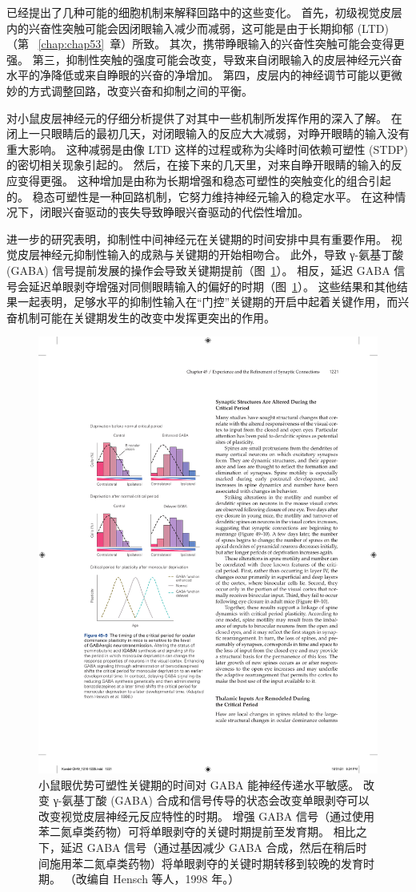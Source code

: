 已经提出了几种可能的细胞机制来解释回路中的这些变化。
首先，初级视觉皮层内的兴奋性突触可能会因闭眼输入减少而减弱，这可能是由于长期抑郁 (LTD)（第 ~\ref{chap:chap53}~章）所致。
其次，携带睁眼输入的兴奋性突触可能会变得更强。
第三，抑制性突触的强度可能会改变，导致来自闭眼输入的皮层神经元兴奋水平的净降低或来自睁眼的兴奋的净增加。
第四，皮层内的神经调节可能以更微妙的方式调整回路，改变兴奋和抑制之间的平衡。


对小鼠皮层神经元的仔细分析提供了对其中一些机制所发挥作用的深入了解。
在闭上一只眼睛后的最初几天，对闭眼输入的反应大大减弱，对睁开眼睛的输入没有重大影响。
这种减弱是由像 LTD 这样的过程或称为尖峰时间依赖可塑性 (STDP) 的密切相关现象引起的。
然后，在接下来的几天里，对来自睁开眼睛的输入的反应变得更强。
这种增加是由称为长期增强和稳态可塑性的突触变化的组合引起的。
稳态可塑性是一种回路机制，它努力维持神经元输入的稳定水平。
在这种情况下，闭眼兴奋驱动的丧失导致睁眼兴奋驱动的代偿性增加。


进一步的研究表明，抑制性中间神经元在关键期的时间安排中具有重要作用。
视觉皮层神经元抑制性输入的成熟与关键期的开始相吻合。
此外，导致 γ-氨基丁酸 (GABA) 信号提前发展的操作会导致关键期提前（图~\ref{fig:49_9}）。
相反，延迟 GABA 信号会延迟单眼剥夺增强对同侧眼睛输入的偏好的时期（图~\ref{fig:49_9}）。
这些结果和其他结果一起表明，足够水平的抑制性输入在“门控”关键期的开启中起着关键作用，而兴奋机制可能在关键期发生的改变中发挥更突出的作用。


\begin{figure}[htbp]
	\centering
	\includegraphics[width=0.5\linewidth]{chap49/fig_49_9}
	\caption{小鼠眼优势可塑性关键期的时间对 GABA 能神经传递水平敏感。 改变 γ-氨基丁酸 (GABA) 合成和信号传导的状态会改变单眼剥夺可以改变视觉皮层神经元反应特性的时期。 增强 GABA 信号（通过使用苯二氮卓类药物）可将单眼剥夺的关键时期提前至发育期。 相比之下，延迟 GABA 信号（通过基因减少 GABA 合成，然后在稍后时间施用苯二氮卓类药物）将单眼剥夺的关键时期转移到较晚的发育时期。 （改编自 Hensch 等人，1998 年。）}
	\label{fig:49_9}
\end{figure}



